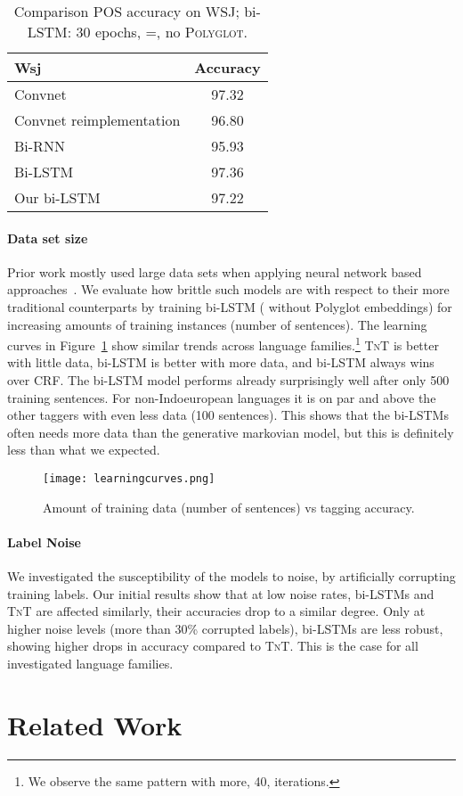 \documentclass[11pt]{article}
\begin{document}
\begin{table}\centering
\begin{small}
\begin{tabular}{lc}
\toprule
{\sc Wsj} & Accuracy\\
\midrule
Convnet \cite{santos:zadrozny:2014} & 97.32\\
Convnet reimplementation \cite{ling:ea:2015} & 96.80\\
Bi-RNN \cite{ling:ea:2015} & 95.93\\
Bi-LSTM \cite{ling:ea:2015} & 97.36\\
\midrule
Our bi-LSTM  & 97.22\\
\bottomrule
\end{tabular}
\end{small}
\caption{Comparison POS accuracy on WSJ; bi-LSTM: 30 epochs, =, no \textsc{Polyglot}.}
\label{tbl:WSJ}
\end{table}


\paragraph{Data set size} Prior work mostly used large data sets when applying neural network based 
approaches~\cite{zhang:ea:2015:char}. We evaluate how brittle such models are with respect to their more
traditional counterparts by training bi-LSTM ( without Polyglot embeddings) for increasing amounts of training instances (number of sentences). The learning curves in Figure~\ref{fig:curve} 
show similar trends across language families.\footnote{We observe the same pattern with more, 40, iterations.} 
\textsc{TnT} is better with little data, bi-LSTM is better with more data, 
and bi-LSTM always wins over CRF. The bi-LSTM model performs already surprisingly well after only 500 training sentences. 
For non-Indoeuropean languages it is on par and above the other taggers with even less data (100 sentences). 
This shows that the bi-LSTMs often needs more data than the generative markovian model, but this is definitely less than what we expected. 


\begin{figure}
\texttt{[image: learningcurves.png]}
\caption{Amount of training data (number of sentences) vs tagging accuracy. }
\label{fig:curve}
\end{figure}

\paragraph{Label Noise} We investigated the susceptibility of the models to noise, by artificially corrupting training labels. 
Our initial results show that at low noise rates, bi-LSTMs and \textsc{TnT} are affected similarly, their accuracies drop to a similar degree. Only at higher noise levels (more than 30\% corrupted labels), bi-LSTMs are less robust, showing higher drops in accuracy compared to \textsc{TnT}. This is the case for all investigated language families. \section{Related Work}
\end{document}

